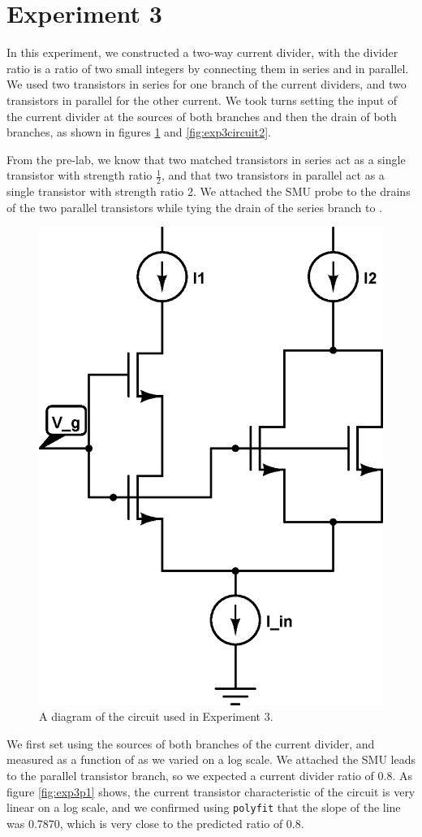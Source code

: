 \section*{Experiment 3}

In this experiment, we constructed a two-way current divider, with the divider ratio is a ratio of
two small integers by connecting them in series and in parallel. We used two \nMOS transistors in series for one branch of the current dividers, and two \nMOS transistors in parallel for the other current. We took turns setting the input of the current divider at the sources of both branches and then the drain of both branches, as shown in figures \ref{fig:exp3p1dia} and \ref{fig:exp3circuit2}.

From the pre-lab, we know that two matched transistors in series act as a single \nMOS transistor with strength ratio $\frac{1}{2}$, and that two \nMOS transistors in parallel act as a single \nMOS transistor with strength ratio 2. We attached the SMU probe to the drains of the two parallel \nMOS transistors while tying the drain of the series \nMOS branch to \Vdd. 

\begin{figure}[H]
\centering
\includegraphics[width=0.55\linewidth]{../Figures/Experiment3CircuitDiagram1.eps}
\caption{A diagram of the circuit used in Experiment 3.}
\label{fig:exp3p1dia}
\end{figure}

We first set \Iin using the sources of both branches of the current divider, and measured \Iout as a function of \Iin as we varied \Iin on a log scale. We attached the SMU leads to the parallel transistor branch, so we expected a current divider ratio of 0.8. As figure \ref{fig:exp3p1} shows, the current transistor characteristic of the circuit is very linear on a log scale, and we confirmed using \texttt{polyfit} that the slope of the line was 0.7870, which is very close to the predicted ratio of 0.8.

